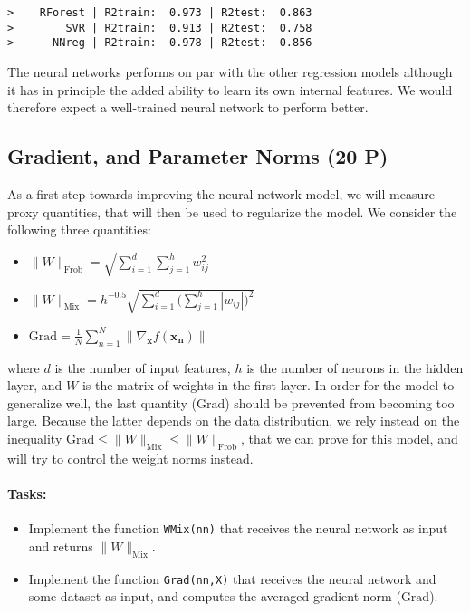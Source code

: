 \documentclass[11pt]{article}
\providecommand{\tightlist}{%
      \setlength{\itemsep}{0pt}\setlength{\parskip}{0pt}}
\begin{document}
    \begin{Verbatim}[commandchars=\\\{\}]
>    RForest | R2train:  0.973 | R2test:  0.863
>        SVR | R2train:  0.913 | R2test:  0.758
>      NNreg | R2train:  0.978 | R2test:  0.856

    \end{Verbatim}

    The neural networks performs on par with the other regression models
although it has in principle the added ability to learn its own internal
features. We would therefore expect a well-trained neural network to
perform better.

\subsection{Gradient, and Parameter Norms (20
P)}\label{gradient-and-parameter-norms-20-p}

As a first step towards improving the neural network model, we will
measure proxy quantities, that will then be used to regularize the
model. We consider the following three quantities:

\begin{itemize}
\tightlist
\item
  \(\|W\|_\text{Frob} = \sqrt{\sum_{i=1}^d \sum_{j=1}^h w_{ij}^2}\)
\item
  \(\|W\|_\text{Mix} = h^{-0.5} \sqrt{\sum_{i=1}^d \big(\sum_{j=1}^h | w_{ij}|\big)^2}\)
\item
  \(\text{Grad} = \textstyle \frac1N \sum_{n=1}^N\|\nabla_{\boldsymbol{x}}f (\boldsymbol{x_n})\|\)
\end{itemize}

where \(d\) is the number of input features, \(h\) is the number of
neurons in the hidden layer, and \(W\) is the matrix of weights in the
first layer. In order for the model to generalize well, the last
quantity (\(\text{Grad}\)) should be prevented from becoming too large.
Because the latter depends on the data distribution, we rely instead on
the inequality
\(\text{Grad} \leq \|W\|_\text{Mix} \leq \|W\|_\text{Frob}\), that we
can prove for this model, and will try to control the weight norms
instead.

\paragraph{Tasks:}\label{tasks}

\begin{itemize}
\tightlist
\item
  Implement the function \texttt{WMix(nn)} that receives the neural
  network as input and returns \(\|W\|_\text{Mix}\).
\item
  Implement the function \texttt{Grad(nn,X)} that receives the neural
  network and some dataset as input, and computes the averaged gradient
  norm (\(\text{Grad}\)).
\end{itemize}
\end{document}
